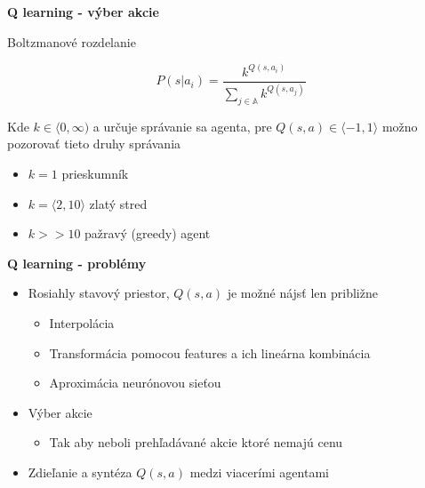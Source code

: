\documentclass[xcolor=dvipsnames]{beamer}
\begin{document}
\begin{frame}{\bf Q learning - výber akcie}

Boltzmanové rozdelanie

\begin{equation}
P(s|a_i) = \frac{k^{Q(s, a_i)}} {{\sum_{j \in \mathbb{A}}{} k^{Q(s, a_j)}}} \nonumber
\end{equation}

Kde $k \in \langle 0, \infty )$ a určuje správanie sa agenta, pre $Q(s, a) \in \langle -1, 1 \rangle$
možno pozorovať tieto druhy správania

\begin{itemize}
\item{$k = 1$ prieskumník}
\item{$k = \langle 2, 10 \rangle$ zlatý stred}
\item{$k >> 10$ pažravý (greedy) agent}
\end{itemize}

\end{frame}


\begin{frame}{\bf Q learning - problémy}

\begin{itemize}
\item{Rosiahly stavový priestor, $Q(s, a)$ je možné nájsť len približne}

    \begin{itemize}
    \item{Interpolácia}
    \item{Transformácia pomocou features a ich lineárna kombinácia}
    \item{Aproximácia neurónovou sieťou}
    \end{itemize}

\item{Výber akcie}
    \begin{itemize}
    \item{Tak aby neboli prehľadávané akcie ktoré nemajú cenu}
    \end{itemize}

\item{Zdieľanie a syntéza $Q(s, a)$ medzi viacerími agentami}

\end{itemize}

\end{frame}
\end{document}

